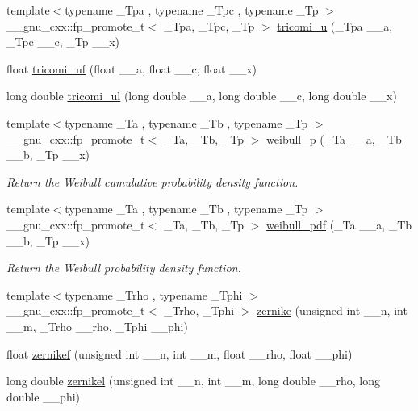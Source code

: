 \begin{DoxyCompactItemize}
\item 
{\footnotesize template$<$typename \+\_\+\+Tpa , typename \+\_\+\+Tpc , typename \+\_\+\+Tp $>$ }\\\+\_\+\+\_\+gnu\+\_\+cxx\+::fp\+\_\+promote\+\_\+t$<$ \+\_\+\+Tpa, \+\_\+\+Tpc, \+\_\+\+Tp $>$ \hyperlink{group__gnu__math__spec__func_gaf51a13fad85006e4d65c5b117e49f7d8}{tricomi\+\_\+u} (\+\_\+\+Tpa \+\_\+\+\_\+a, \+\_\+\+Tpc \+\_\+\+\_\+c, \+\_\+\+Tp \+\_\+\+\_\+x)
\item 
float \hyperlink{group__gnu__math__spec__func_gab6eb5ec587642bf0952d6c3df1c64904}{tricomi\+\_\+uf} (float \+\_\+\+\_\+a, float \+\_\+\+\_\+c, float \+\_\+\+\_\+x)
\item 
long double \hyperlink{group__gnu__math__spec__func_gac5213af3913aeb8beb7206688889c60c}{tricomi\+\_\+ul} (long double \+\_\+\+\_\+a, long double \+\_\+\+\_\+c, long double \+\_\+\+\_\+x)
\item 
{\footnotesize template$<$typename \+\_\+\+Ta , typename \+\_\+\+Tb , typename \+\_\+\+Tp $>$ }\\\+\_\+\+\_\+gnu\+\_\+cxx\+::fp\+\_\+promote\+\_\+t$<$ \+\_\+\+Ta, \+\_\+\+Tb, \+\_\+\+Tp $>$ \hyperlink{group__gnu__math__spec__func_ga9afb3065fea6ef3a91126d67f726f7af}{weibull\+\_\+p} (\+\_\+\+Ta \+\_\+\+\_\+a, \+\_\+\+Tb \+\_\+\+\_\+b, \+\_\+\+Tp \+\_\+\+\_\+x)
\begin{DoxyCompactList}\small\item\em Return the Weibull cumulative probability density function. \end{DoxyCompactList}\item 
{\footnotesize template$<$typename \+\_\+\+Ta , typename \+\_\+\+Tb , typename \+\_\+\+Tp $>$ }\\\+\_\+\+\_\+gnu\+\_\+cxx\+::fp\+\_\+promote\+\_\+t$<$ \+\_\+\+Ta, \+\_\+\+Tb, \+\_\+\+Tp $>$ \hyperlink{group__gnu__math__spec__func_gacfbb6ca9df8e0aa092ff4406baff597c}{weibull\+\_\+pdf} (\+\_\+\+Ta \+\_\+\+\_\+a, \+\_\+\+Tb \+\_\+\+\_\+b, \+\_\+\+Tp \+\_\+\+\_\+x)
\begin{DoxyCompactList}\small\item\em Return the Weibull probability density function. \end{DoxyCompactList}\item 
{\footnotesize template$<$typename \+\_\+\+Trho , typename \+\_\+\+Tphi $>$ }\\\+\_\+\+\_\+gnu\+\_\+cxx\+::fp\+\_\+promote\+\_\+t$<$ \+\_\+\+Trho, \+\_\+\+Tphi $>$ \hyperlink{group__gnu__math__spec__func_gaaed33f29c1eb1d2c5b9590fe2e57151c}{zernike} (unsigned int \+\_\+\+\_\+n, int \+\_\+\+\_\+m, \+\_\+\+Trho \+\_\+\+\_\+rho, \+\_\+\+Tphi \+\_\+\+\_\+phi)
\item 
float \hyperlink{group__gnu__math__spec__func_gababce1066ecef7258070b9b7fcea975f}{zernikef} (unsigned int \+\_\+\+\_\+n, int \+\_\+\+\_\+m, float \+\_\+\+\_\+rho, float \+\_\+\+\_\+phi)
\item 
long double \hyperlink{group__gnu__math__spec__func_ga9236dd8545b448da9cb05dd8b7cf6811}{zernikel} (unsigned int \+\_\+\+\_\+n, int \+\_\+\+\_\+m, long double \+\_\+\+\_\+rho, long double \+\_\+\+\_\+phi)
\end{DoxyCompactItemize}


